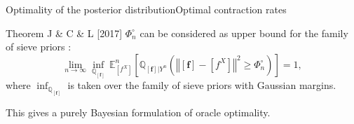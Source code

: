 \documentclass[10pt]{beamer}
\begin{document}
\begin{frame}{Optimality of the posterior distribution}{Optimal contraction rates}

\begin{block}{Theorem J \& C \& L [2017]}
$\Phi_{n}^{\circ}$ can be considered as upper bound for the family of sieve priors :
\[\lim\limits_{n \rightarrow \infty} \inf\limits_{\mathbb{Q}_{\left[\boldsymbol{f}\right]}}\, \mathbb{E}_{\left[ f^{X} \right]}^{n}\left[\mathbb{Q}_{\left[\boldsymbol{f}\right] \vert Y^{n}}\left(\left\Vert \left[\boldsymbol{f}\right] - \left[ f^{X}\right] \right\Vert^{2} \geq \Phi_{n}^{\circ}\right)\right] = 1,\]
where $\inf_{\mathbb{Q}_{\left[\boldsymbol{f}\right]}}$ is taken over the family of sieve priors with Gaussian margins.
\end{block}
This gives a purely Bayesian formulation of oracle optimality.

\end{frame}
\end{document}
